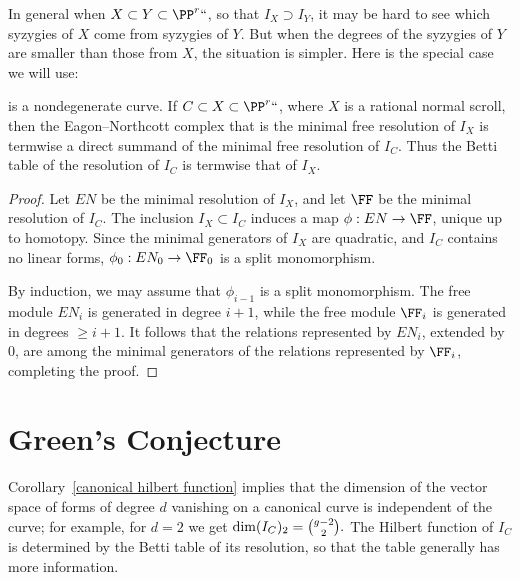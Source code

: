 In general when $X\subset Y\subset \PP^r` `$, so that $I_X \supset I_Y$,
it may be hard to see which syzygies of $X$ come
from syzygies of $Y$. But when the degrees of the syzygies of $Y$ are
smaller than those from $X$, the situation is simpler.
Here is the special case we will use:

\begin{proposition}
is a nondegenerate curve. If $C\subset X
\subset \PP^r` `$, where $X$ is a rational
%
normal scroll, then the Eagon--Northcott complex that is  the minimal
free resolution of $I_X$ is termwise a direct summand
of the minimal free resolution of $I_C$. Thus the Betti table of the
%
resolution of $I_C$ is termwise 
that of $I_X$.
\unif
\end{proposition}

\begin{proof}
Let $EN$ be the minimal resolution of $I_X$, and let $\FF$ be the minimal
resolution of $I_C$.
The inclusion $I_X \subset I_C$ induces a map $\phi: EN\to \FF$, unique
up to homotopy. Since the minimal generators of $I_X$ are quadratic,
and $I_C$ contains no linear forms, $\phi_0: EN_0\to \FF_0$ is a split
monomorphism.

By induction, we may assume that $\phi_{i-1}$ is a split monomorphism. The
free module $EN_{i}$ is generated in
degree $i+1$, while the free module $\FF_i$ is generated in degrees
$\geq i+1$. It follows that the relations
represented by $EN_i$, extended by 0, are among the minimal generators
of the relations represented by $\FF_i$,
completing the proof.
\end{proof}

\section{Green's Conjecture}

Corollary~\ref{canonical hilbert function} implies that the dimension
%
of the vector space of forms of degree $d$
vanishing on a canonical curve is independent of the curve; for example,
for $d=2$ we get
$
\dim ({I_{C}})_{2} = \tbinom{g-2}{2}.
$
The Hilbert function of $I_C$ is determined by the Betti table of its
%
resolution, so that the table generally has more information.

